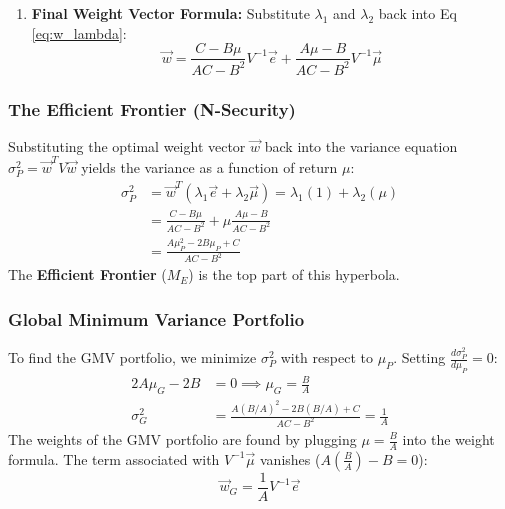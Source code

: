 \begin{enumerate}
    Solving this system for $\lambda_1, \lambda_2$ (provided $AC - B^2 \neq 0$):
    \begin{equation*}
        \begin{bmatrix} \lambda_1 \\ \lambda_2 \end{bmatrix}
        = \frac{1}{AC - B^2} \begin{bmatrix} C & -B \\ -B & A \end{bmatrix} \begin{bmatrix} 1 \\ \mu \end{bmatrix}
        = \begin{bmatrix} \frac{C - B\mu}{AC - B^2} \\ \frac{A\mu - B}{AC - B^2} \end{bmatrix}
    \end{equation*}

    \item \textbf{Final Weight Vector Formula:}
    Substitute $\lambda_1$ and $\lambda_2$ back into Eq \eqref{eq:w_lambda}:
    \begin{equation*}
        \boxed{\vec{w} = \frac{C - B\mu}{AC - B^2}V^{-1}\vec{e} + \frac{A\mu - B}{AC - B^2}V^{-1}\vec{\mu}}
    \end{equation*}
\end{enumerate}

\subsubsection{The Efficient Frontier (N-Security)}
Substituting the optimal weight vector $\vec{w}$ back into the variance equation $\sigma_P^2 = \vec{w}^T V \vec{w}$ yields the variance as a function of return $\mu$:
\begin{align*}
    \sigma_P^2 &= \vec{w}^T (\lambda_1 \vec{e} + \lambda_2 \vec{\mu}) = \lambda_1(1) + \lambda_2(\mu) \\
    &= \frac{C - B\mu}{AC - B^2} + \mu \frac{A\mu - B}{AC - B^2}\\
    &= \frac{A\mu_P^2 - 2B\mu_P + C}{AC - B^2}
\end{align*}
The \textbf{Efficient Frontier} ($M_E$) is the top part of this hyperbola.

\subsubsection{Global Minimum Variance Portfolio}
To find the GMV portfolio, we minimize $\sigma_P^2$ with respect to $\mu_P$. Setting $\frac{d\sigma_P^2}{d\mu_P} = 0$:
\begin{align*}
    2A\mu_G - 2B &= 0 \implies \mu_G = \frac{B}{A} \\
    \sigma_G^2 &= \frac{A(B/A)^2 - 2B(B/A) + C}{AC - B^2} = \frac{1}{A}
\end{align*}
The weights of the GMV portfolio are found by plugging $\mu = \frac{B}{A}$ into the weight formula. The term associated with $V^{-1}\vec{\mu}$ vanishes ($A(\frac{B}{A})-B = 0$):
\begin{equation*}
    \boxed{\vec{w}_G = \frac{1}{A}V^{-1}\vec{e}}
\end{equation*}

